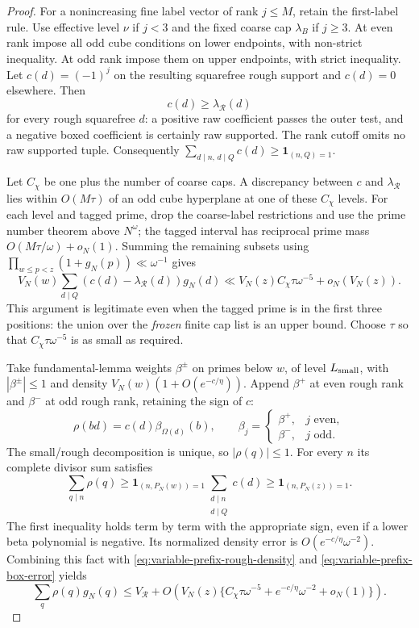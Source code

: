 \documentclass[11pt]{article}
\begin{document}
\begin{proof}
For a nonincreasing fine label vector of rank $j\le M$, retain
the first-label rule. Use effective level $\nu$ if $j<3$ and
the fixed coarse cap $\lambda_B$ if $j\ge3$.
At even rank impose all odd cube conditions on lower endpoints,
with non-strict inequality. At odd rank impose them on upper
endpoints, with strict inequality. Let $c(d)=(-1)^j$ on the
resulting squarefree rough support and $c(d)=0$ elsewhere.
Then
\[
 c(d)\ge\lambda_{\mathcal R}(d)
\]
for every rough squarefree $d$: a positive raw coefficient passes
the outer test, and a negative boxed coefficient is certainly raw
supported. The rank cutoff omits no raw supported tuple.
Consequently $\sum_{d\mid n,\,d\mid Q}c(d)\ge\mathbf1_{(n,Q)=1}$.

Let $C_\chi$ be one plus the number of coarse caps. A discrepancy
between $c$ and $\lambda_{\mathcal R}$ lies within $O(M\tau)$
of an odd cube hyperplane at one of these $C_\chi$ levels.
For each level and tagged prime, drop the coarse-label restrictions
and use the prime number theorem above $N^\omega$; the tagged
interval has reciprocal prime mass $O(M\tau/\omega)+o_N(1)$.
Summing the remaining subsets using
$\prod_{w\le p<z}(1+g_N(p))\ll\omega^{-1}$ gives
\begin{equation}\label{eq:variable-prefix-box-error}
 V_N(w)\sum_{d\mid Q}(c(d)-\lambda_{\mathcal R}(d))g_N(d)
 \ll V_N(z)C_\chi\tau\omega^{-5}+o_N(V_N(z)).
\end{equation}
This argument is legitimate even when the tagged prime is in the
first three positions: the union over the \emph{frozen} finite cap
list is an upper bound. Choose $\tau$ so that
$C_\chi\tau\omega^{-5}$ is as small as required.

Take fundamental-lemma weights $\beta^\pm$ on primes below $w$,
of level $L_{\rm small}$, with $|\beta^\pm|\le1$ and density
$V_N(w)(1+O(e^{-c/\eta}))$. Append $\beta^+$ at even rough rank
and $\beta^-$ at odd rough rank, retaining the sign of $c$:
\[
 \rho(bd)=c(d)\beta_{\Omega(d)}(b),\qquad
 \beta_j=\begin{cases}\beta^+,&j\text{ even},\\
                         \beta^-,&j\text{ odd}.
          \end{cases}
\]
The small/rough decomposition is unique, so $|\rho(q)|\le1$.
For every $n$ its complete divisor sum satisfies
\[
 \sum_{q\mid n}\rho(q)
 \ge\mathbf1_{(n,P_N(w))=1}
        \sum_{\substack{d\mid n\\d\mid Q}}c(d)
 \ge\mathbf1_{(n,P_N(z))=1}.
\]
The first inequality holds term by term with the appropriate sign,
even if a lower beta polynomial is negative. Its normalized density
error is $O(e^{-c/\eta}\omega^{-2})$. Combining this fact with
\eqref{eq:variable-prefix-rough-density} and
\eqref{eq:variable-prefix-box-error} yields
\begin{equation}\label{eq:variable-prefix-complete-density}
 \sum_q\rho(q)g_N(q)
 \le V_{\mathcal R}+
 O\left(V_N(z)\{C_\chi\tau\omega^{-5}
                     +e^{-c/\eta}\omega^{-2}+o_N(1)\}\right).
\end{equation}


\end{proof}
\end{document}
